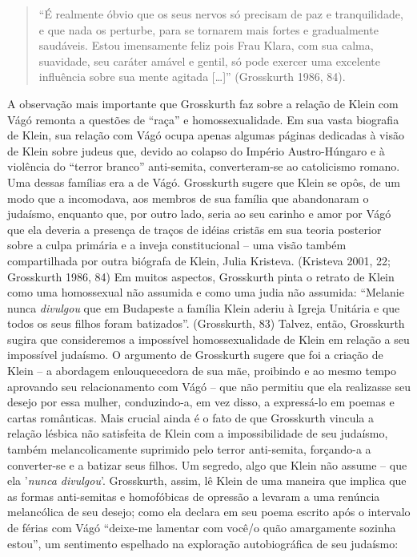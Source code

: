 \begin{quote}
``É realmente óbvio que os seus nervos só precisam de paz e
tranquilidade, e que nada os perturbe, para se tornarem mais fortes e
gradualmente saudáveis. Estou imensamente feliz pois Frau Klara, com sua
calma, suavidade, seu caráter amável e gentil, só pode exercer uma
excelente influência sobre sua mente agitada {[}\ldots{}{]}'' (Grosskurth
1986, 84).
\end{quote}

A observação mais importante que Grosskurth faz sobre a relação de Klein
com Vágó remonta a questões de ``raça'' e homossexualidade. Em sua vasta
biografia de Klein, sua relação com Vágó ocupa apenas algumas páginas
dedicadas à visão de Klein sobre judeus que, devido ao colapso do
Império Austro-Húngaro e à violência do ``terror branco'' anti-semita,
converteram-se ao catolicismo romano. Uma dessas famílias era a de Vágó.
Grosskurth sugere que Klein se opôs, de um modo que a incomodava, aos
membros de sua família que abandonaram o judaísmo, enquanto que, por
outro lado, seria ao seu carinho e amor por Vágó que ela deveria a
presença de traços de idéias cristãs em sua teoria posterior sobre a
culpa primária e a inveja constitucional -- uma visão também
compartilhada por outra biógrafa de Klein, Julia Kristeva. (Kristeva
2001, 22; Grosskurth 1986, 84) Em muitos aspectos, Grosskurth pinta o
retrato de Klein como uma homossexual não assumida e como uma judia não
assumida: ``Melanie nunca \emph{divulgou} que em Budapeste a família
Klein aderiu à Igreja Unitária e que todos os seus filhos foram
batizados''. (Grosskurth, 83) Talvez, então, Grosskurth sugira que
consideremos a impossível homossexualidade de Klein em relação a seu
impossível judaísmo. O argumento de Grosskurth sugere que foi a criação
de Klein -- a abordagem enlouquecedora de sua mãe, proibindo e ao mesmo
tempo aprovando seu relacionamento com Vágó -- que não permitiu que ela
realizasse seu desejo por essa mulher, conduzindo-a, em vez disso, a
expressá-lo em poemas e cartas românticas. Mais crucial ainda é o fato
de que Grosskurth vincula a relação lésbica não satisfeita de Klein com
a impossibilidade de seu judaísmo, também melancolicamente suprimido
pelo terror anti-semita, forçando-a a converter-se e a batizar seus
filhos. Um segredo, algo que Klein não assume -- que ela '\emph{nunca
divulgou}'. Grosskurth, assim, lê Klein de uma maneira que implica que
as formas anti-semitas e homofóbicas de opressão a levaram a uma
renúncia melancólica de seu desejo; como ela declara em seu poema
escrito após o intervalo de férias com Vágó ``deixe-me lamentar com
você/o quão amargamente sozinha estou'', um sentimento espelhado na
exploração autobiográfica de seu judaísmo:

